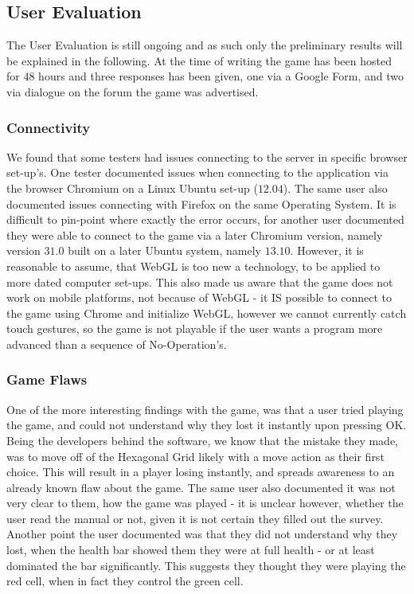 \subsection{User Evaluation}

The User Evaluation is still ongoing and as such only the preliminary results will be explained in the following. At the time of writing the game has been hosted for $48$ hours and three responses has been given, one via a Google Form, and two via dialogue on the forum the game was advertised.


\subsubsection{Connectivity}

We found that some testers had issues connecting to the server in specific browser set-up's. One tester documented issues when connecting to the application via the browser Chromium on a Linux Ubuntu set-up ($12.04$). The same user also documented issues connecting with Firefox on the same Operating System. It is difficult to pin-point where exactly the error occurs, for another user documented they were able to connect to the game via a later Chromium version, namely version $31.0$ built on a later Ubuntu system, namely $13.10$. However, it is reasonable to assume, that WebGL is too new a technology, to be applied to more dated computer set-ups. This also made us aware that the game does not work on mobile platforms, not because of WebGL - it IS possible to connect to the game using Chrome and initialize WebGL, however we cannot currently catch touch gestures, so the game is not playable if the user wants a program more advanced than a sequence of No-Operation's.

\subsubsection{Game Flaws}

One of the more interesting findings with the game, was that a user tried playing the game, and could not understand why they lost it instantly upon pressing OK. Being the developers behind the software, we know that the mistake they made, was to move off of the Hexagonal Grid likely with a move action as their first choice. This will result in a player losing instantly, and spreads awareness to an already known flaw about the game. The same user also documented it was not very clear to them, how the game was played - it is unclear however, whether the user read the manual or not, given it is not certain they filled out the survey. Another point the user documented was that they did not understand why they lost, when the health bar showed them they were at full health - or at least dominated the bar significantly. This suggests they thought they were playing the red cell, when in fact they control the green cell.

